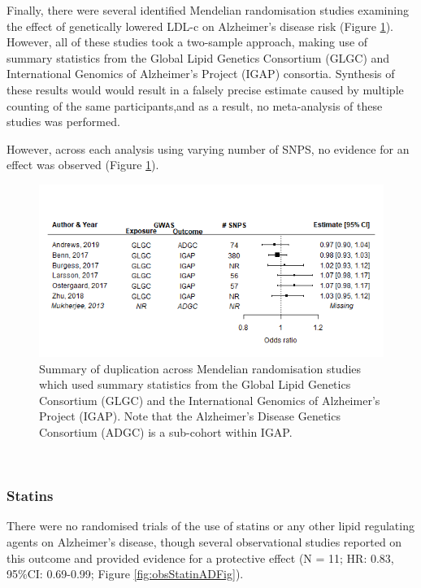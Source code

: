 \documentclass[a4paper, twoside]{templates/ociamthesis}
\begin{document}
Finally, there were several identified Mendelian randomisation studies examining the effect of genetically lowered LDL-c on Alzheimer's disease risk (Figure \ref{fig:mrDuplication}). However, all of these studies took a two-sample approach, making use of summary statistics from the Global Lipid Genetics Consortium (GLGC) and International Genomics of Alzheimer's Project (IGAP) consortia. Synthesis of these results would would result in a falsely precise estimate caused by multiple counting of the same participants,and as a result, no meta-analysis of these studies was performed.

However, across each analysis using varying number of SNPS, no evidence for an effect was observed (Figure \ref{fig:mrDuplication}).





\begin{figure}[H]

{\centering \includegraphics[width=0.8\linewidth]{figures/sys-rev/mrDuplication} 

}

\caption[Summary of duplication across two sample Mendelian randomisation studies]{Summary of duplication across Mendelian randomisation studies which used summary statistics from the Global Lipid Genetics Consortium (GLGC) and the International Genomics of Alzheimer's Project (IGAP). Note that the Alzheimer's Disease Genetics Consortium (ADGC) is a sub-cohort within IGAP.}\label{fig:mrDuplication}
\end{figure}

~

\hypertarget{statins-1}{%
\subsubsection{Statins}\label{statins-1}}

There were no randomised trials of the use of statins or any other lipid regulating agents on Alzheimer's disease, though several observational studies reported on this outcome and provided evidence for a protective effect (N = 11; HR: 0.83, 95\%CI: 0.69-0.99; Figure \ref{fig:obsStatinADFig}).
\end{document}
